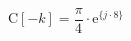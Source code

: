\begin{center}
\[
\textrm{C}[-k] = \frac{\pi}{4} \cdot \textrm{e}^{\{ j \cdot 8 \}}
\]
\end{center}
